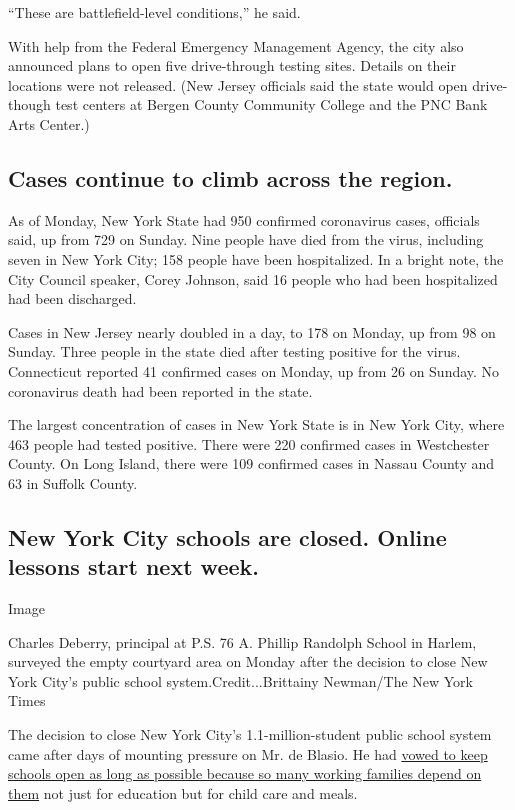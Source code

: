 ``These are battlefield-level conditions,'' he said.

With help from the Federal Emergency Management Agency, the city also
announced plans to open five drive-through testing sites. Details on
their locations were not released. (New Jersey officials said the state
would open drive-though test centers at Bergen County Community College
and the PNC Bank Arts Center.)

\hypertarget{cases-continue-to-climb-across-the-region}{%
\subsection{Cases continue to climb across the
region.}\label{cases-continue-to-climb-across-the-region}}

As of Monday, New York State had 950 confirmed coronavirus cases,
officials said, up from 729 on Sunday. Nine people have died from the
virus, including seven in New York City; 158 people have been
hospitalized. In a bright note, the City Council speaker, Corey Johnson,
said 16 people who had been hospitalized had been discharged.

Cases in New Jersey nearly doubled in a day, to 178 on Monday, up from
98 on Sunday. Three people in the state died after testing positive for
the virus. Connecticut reported 41 confirmed cases on Monday, up from 26
on Sunday. No coronavirus death had been reported in the state.

The largest concentration of cases in New York State is in New York
City, where 463 people had tested positive. There were 220 confirmed
cases in Westchester County. On Long Island, there were 109 confirmed
cases in Nassau County and 63 in Suffolk County.

\hypertarget{new-york-city-schools-are-closed-online-lessons-start-next-week}{%
\subsection{New York City schools are closed. Online lessons start next
week.}\label{new-york-city-schools-are-closed-online-lessons-start-next-week}}

Image

Charles Deberry, principal at P.S. 76 A. Phillip Randolph School in
Harlem, surveyed the empty courtyard area on Monday after the decision
to close New York City's public school system.Credit...Brittainy
Newman/The New York Times

The decision to close New York City's 1.1-million-student public school
system came after days of mounting pressure on Mr. de Blasio. He had
\href{https://www.nytimes.com/2020/03/16/nyregion/nyc-schools-closed-coronavirus.html}{vowed
to keep schools open as long as possible because so many working
families depend on them} not just for education but for child care and
meals.

